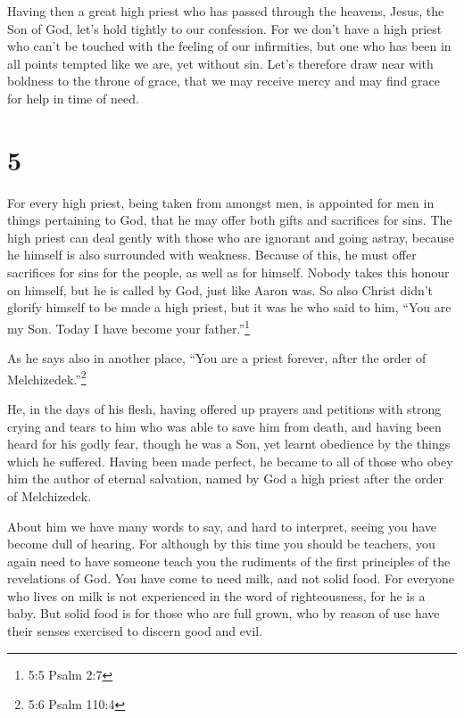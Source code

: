  Having then a great high priest who has passed through the
heavens, Jesus, the Son of God, let's hold tightly to our confession.
 For we don't have a high priest who can't be touched with
the feeling of our infirmities, but one who has been in all points
tempted like we are, yet without sin.  Let's therefore draw
near with boldness to the throne of grace, that we may receive mercy and
may find grace for help in time of need.

\hypertarget{section-4}{%
\section{5}\label{section-4}}

 For every high priest, being taken from amongst men, is
appointed for men in things pertaining to God, that he may offer both
gifts and sacrifices for sins.  The high priest can deal
gently with those who are ignorant and going astray, because he himself
is also surrounded with weakness.  Because of this, he must
offer sacrifices for sins for the people, as well as for himself.
 Nobody takes this honour on himself, but he is called by
God, just like Aaron was.  So also Christ didn't glorify
himself to be made a high priest, but it was he who said to him, ``You
are my Son. Today I have become your father.''\footnote{5:5 Psalm 2:7}

 As he says also in another place, ``You are a priest
forever, after the order of Melchizedek.''\footnote{5:6 Psalm 110:4}

 He, in the days of his flesh, having offered up prayers and
petitions with strong crying and tears to him who was able to save him
from death, and having been heard for his godly fear, 
though he was a Son, yet learnt obedience by the things which he
suffered.  Having been made perfect, he became to all of
those who obey him the author of eternal salvation,  named
by God a high priest after the order of Melchizedek.

 About him we have many words to say, and hard to
interpret, seeing you have become dull of hearing.  For
although by this time you should be teachers, you again need to have
someone teach you the rudiments of the first principles of the
revelations of God. You have come to need milk, and not solid food.
 For everyone who lives on milk is not experienced in the
word of righteousness, for he is a baby.  But solid food is
for those who are full grown, who by reason of use have their senses
exercised to discern good and evil.

